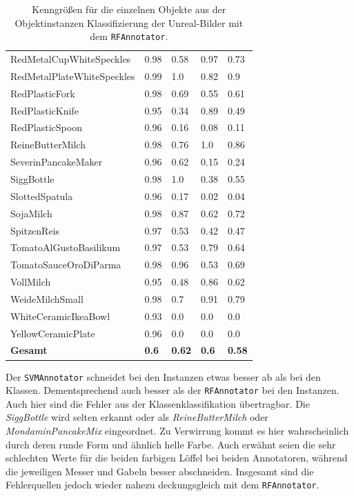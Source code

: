 \begin{table}
\begin{tabularx}{\textwidth}{Xllll}
RedMetalCupWhiteSpeckles & 0.98 & 0.58 & 0.97 & 0.73 \\  
RedMetalPlateWhiteSpeckles & 0.99 & 1.0 & 0.82 & 0.9 \\  
RedPlasticFork & 0.98 & 0.69 & 0.55 & 0.61 \\  
RedPlasticKnife & 0.95 & 0.34 & 0.89 & 0.49 \\  
RedPlasticSpoon & 0.96 & 0.16 & 0.08 & 0.11 \\  
ReineButterMilch & 0.98 & 0.76 & 1.0 & 0.86 \\  
SeverinPancakeMaker & 0.96 & 0.62 & 0.15 & 0.24 \\  
SiggBottle & 0.98 & 1.0 & 0.38 & 0.55 \\  
SlottedSpatula & 0.96 & 0.17 & 0.02 & 0.04 \\  
SojaMilch & 0.98 & 0.87 & 0.62 & 0.72 \\  
SpitzenReis & 0.97 & 0.53 & 0.42 & 0.47 \\  
TomatoAlGustoBasilikum & 0.97 & 0.53 & 0.79 & 0.64 \\  
TomatoSauceOroDiParma & 0.98 & 0.96 & 0.53 & 0.69 \\  
VollMilch & 0.95 & 0.48 & 0.86 & 0.62 \\  
WeideMilchSmall & 0.98 & 0.7 & 0.91 & 0.79 \\  
WhiteCeramicIkeaBowl & 0.93 & 0.0 & 0.0 & 0.0 \\  
YellowCeramicPlate & 0.96 & 0.0 & 0.0 & 0.0 \\   \hline
\textbf{Gesamt}		&	\textbf{0.6}   &	\textbf{0.62}  & \textbf{0.6}     &  \textbf{0.58}     \\
\end{tabularx}
\caption[Objektinstanzen-spezifische Kenngrößen des RFAnnotators]{Kenngrößen für die einzelnen Objekte aus der Objektinstanzen Klassifizierung der Unreal-Bilder mit dem \texttt{RFAnnotator}.}
\label{tab:RFClassifierGTInstance_metrics}
\end{table}

Der \texttt{SVMAnnotator} schneidet bei den Instanzen etwas besser ab als bei den Klassen. Dementsprechend auch besser als der \texttt{RFAnnotator} bei den Instanzen. Auch hier sind die Fehler aus der Klassenklassifikation übertragbar. Die \textit{SiggBottle} wird selten erkannt oder als \textit{ReineButterMilch} oder \textit{MondaminPancakeMix} eingeordnet. Zu Verwirrung kommt es hier wahrscheinlich durch deren runde Form und ähnlich helle Farbe. Auch erwähnt seien die sehr schlechten Werte für die beiden farbigen Löffel bei beiden Annotatoren, während die jeweiligen Messer und Gabeln besser abschneiden. Insgesamt sind die Fehlerquellen jedoch wieder nahezu deckungsgleich mit dem \texttt{RFAnnotator}.

